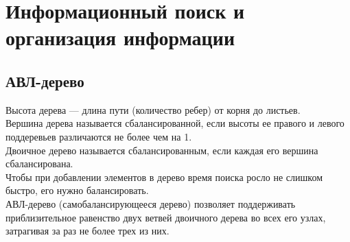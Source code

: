 
\chapter{Информационный поиск и организация информации}

\section{АВЛ-дерево}

\begin{definition}
    Высота дерева --- длина пути (количество ребер) от корня до листьев.\\
    Вершина дерева называется сбалансированной, если высоты ее правого и левого поддеревьев различаются не более чем на 1.\\
    Двоичное дерево называется сбалансированным, если каждая его вершина сбалансирована.\\
    Чтобы при добавлении элементов в дерево время поиска росло не слишком быстро, его нужно балансировать.\\
    АВЛ-дерево (самобалансирующееся дерево) позволяет поддерживать приблизительное равенство двух ветвей двоичного дерева во всех его узлах, затрагивая за раз не более трех из них.
\end{definition}


